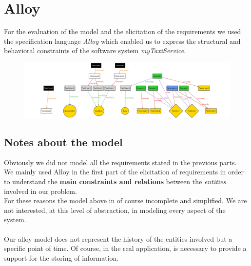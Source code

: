 \section{Alloy}
For the evaluation of the model and the elicitation of the requirements we used the specification language \textit{Alloy} which enabled us to express the structural and behavioral constraints of the software system \textit{myTaxiService}.


\pagebreak
\begin{figure}[H]
\centering
\includegraphics[angle=90, scale=0.5, trim=100 0 180 0]{Appendix/Model}
\end{figure}

\subsection{Notes about the model}
Obviously we did not model all the requirements stated in the previous parts.\\
We mainly used Alloy in the first part of the elicitation of requirements in order to understand the \textbf{main constraints and relations} between the \textit{entities} involved in our problem.\\
For these reasons the model above in of course incomplete and simplified. We are not interested, at this level of abstraction, in modeling every aspect of the system.\\
\\
Our alloy model does not represent the history of the entities involved but a specific point of time. Of course, in the real application, is necessary to provide a support for the storing of information.
